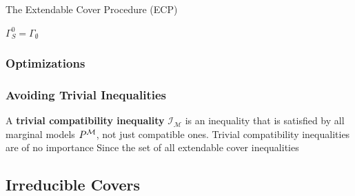 \documentclass[aps, 10pt, english, twoside, pra, nofootinbib, longbibliography]{revtex4-1}
\theoremstyle{plain}
\theoremstyle{definition}
\theoremstyle{remark}
\newcommand{\mscenario}{\mathcal{M}}
\newcommand{\mul}[1]{\Gamma_{#1}}
\newcommand{\term}[1]{\textcolor{Mahogany}{\textbf{#1}}}
\begin{document}
    \begin{algorithm}[H]
    \caption{The Extendable Cover Procedure (ECP)}
    \label{alg:ecp}
    \begin{algorithmic}
      \State $\mul{S}^{0} = \mul{\emptyset}$
    \end{algorithmic}
    \end{algorithm}


    \subsubsection{Optimizations}


    \subsubsection{Avoiding Trivial Inequalities}
    A \term{trivial compatibility inequality} $\mathcal{I}_{\mscenario}$ is an inequality that is satisfied by all marginal models $\prob^{\mscenario}$, not just compatible ones. Trivial compatibility inequalities are of no importance Since the set of all extendable cover inequalities
    \todo[TC]{}
    \subsection{}
    \subsection{Irreducible Covers}
\end{document}
